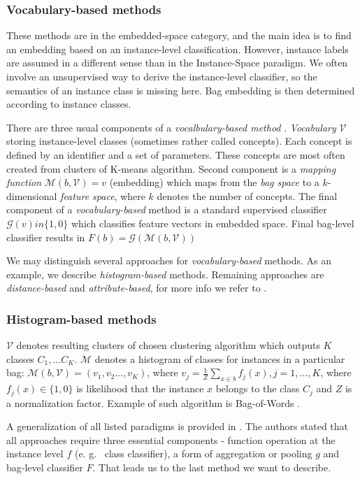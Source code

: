 \subsubsection{Vocabulary-based methods}
These methods are in the embedded-space category, and the main idea is to find an embedding based on an instance-level classification. However, instance labels are assumed in a different sense than in the Instance-Space paradigm. We often involve an unsupervised way to derive the instance-level classifier, so the semantics of an instance class is missing here. Bag embedding is then determined according to instance classes.

There are three usual components of a \emph{vocalbulary-based method} \cite{Amores2013}. \emph{Vocabulary} $\mathcal{V}$ storing instance-level classes (sometimes rather called concepts). Each concept is defined by an identifier and a set of parameters. These concepts are most often created from clusters of K-means algorithm. Second component is a \emph{mapping function} $\mathcal{M}(b, \mathcal{V})=v$ (embedding) which maps from the \emph{bag space} to  a $k$-dimensional \emph{feature space}, where $k$ denotes the number of concepts. The final component of a \emph{vocabulary-based} method is a standard supervised classifier $\mathcal{G}(v) in \{1,0\}$ which classifies feature vectors in embedded space. Final bag-level classifier results in $F(b)=\mathcal{G}(\mathcal{M}(b,\mathcal{V}))$

We may distinguish several approaches for \emph{vocabulary-based} methods. As an example, we describe \emph{histogram-based} methods. Remaining approaches are \emph{distance-based} and \emph{attribute-based}, for more info we refer to \cite{Amores2013}.

\subsubsection{Histogram-based methods}
$\mathcal{V}$ denotes resulting clusters of chosen clustering algorithm which outputs $K$ classes $C_1,\dots C_K$. $\mathcal{M}$ denotes a histogram of classes for instances in a particular bag: $\mathcal{M}(b,\mathcal{V})=(v_1,v_2\dots,v_K)$, where $v_j=\frac{1}{Z}\sum_{x\in b}f_{j}(x), j=1,\dots,K$, where $f_{j}(x) \in \{1,0\}$ is likelihood that the instance $x$ belongs to the class $C_j$ and $Z$ is a normalization factor. Example of such algorithm is Bag-of-Words \cite{Nowak2006}.

A generalization of all listed paradigms is provided in \cite{Mandlik2020}. The authors stated that all approaches require three essential components - function operation at the instance level $f$ (e. g. \ class classifier), a form of aggregation or pooling $g$ and bag-level classifier $F$. That leads us to the last method we want to describe.

